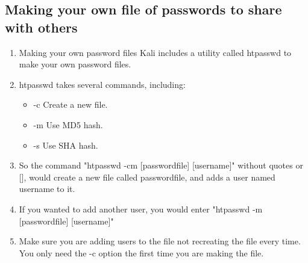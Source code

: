 \documentclass[12pt]{article}
\begin{document}
\subsection*{Making your own file of passwords to share with others}
\begin{enumerate}
    \item Making your own password files
    Kali includes a utility called htpasswd to make your own password files.
    \item htpasswd  takes several commands, including:
        \begin{itemize}
            \item -c    Create a new file.
            \item -m    Use MD5 hash.
            \item -s    Use SHA hash. 
        \end{itemize}
    \item So the command
    "htpasswd -cm [passwordfile] [username]" without quotes or [], would create a new file called passwordfile, and adds a user named username to it.
    \item If you wanted to add another user, you would enter
    "htpasswd -m [passwordfile] [username]" 
    \item Make sure you are adding users to the file not recreating the file every time.  You only need the -c option the first time you are making the file. 
    



\end{enumerate}
\end{document}
